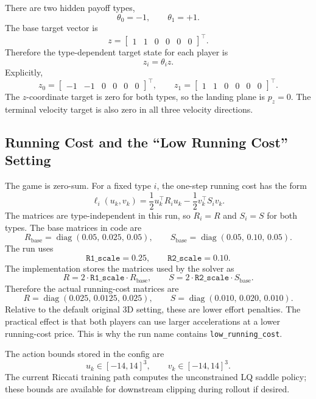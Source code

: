 \documentclass[11pt]{article}
\begin{document}
There are two hidden payoff types,
\[
    \theta_0=-1,\qquad \theta_1=+1.
\]
The base target vector is
\[
    z =
    \begin{bmatrix}
        1 & 1 & 0 & 0 & 0 & 0
    \end{bmatrix}^{\!\top}.
\]
Therefore the type-dependent target state for each player is
\[
    z_i = \theta_i z.
\]
Explicitly,
\[
    z_0 =
    \begin{bmatrix}
        -1 & -1 & 0 & 0 & 0 & 0
    \end{bmatrix}^{\!\top},
    \qquad
    z_1 =
    \begin{bmatrix}
        1 & 1 & 0 & 0 & 0 & 0
    \end{bmatrix}^{\!\top}.
\]
The $z$-coordinate target is zero for both types, so the landing plane is
$p_z=0$.  The terminal velocity target is also zero in all three velocity
directions.

\subsection{Running Cost and the ``Low Running Cost'' Setting}

The game is zero-sum.  For a fixed type $i$, the one-step running cost has the
form
\[
    \ell_i(u_k,v_k)
    =
    \frac{1}{2} u_k^\top R_i u_k
    -
    \frac{1}{2} v_k^\top S_i v_k.
\]
The matrices are type-independent in this run, so $R_i=R$ and $S_i=S$ for
both types.  The base matrices in code are
\[
    R_{\text{base}} =
    \operatorname{diag}(0.05,\,0.025,\,0.05),
    \qquad
    S_{\text{base}} =
    \operatorname{diag}(0.05,\,0.10,\,0.05).
\]
The run uses
\[
    \texttt{R1\_scale}=0.25,
    \qquad
    \texttt{R2\_scale}=0.10.
\]
The implementation stores the matrices used by the solver as
\[
    R = 2 \cdot \texttt{R1\_scale} \cdot R_{\text{base}},
    \qquad
    S = 2 \cdot \texttt{R2\_scale} \cdot S_{\text{base}}.
\]
Therefore the actual running-cost matrices are
\[
    R =
    \operatorname{diag}(0.025,\,0.0125,\,0.025),
    \qquad
    S =
    \operatorname{diag}(0.010,\,0.020,\,0.010).
\]
Relative to the default original 3D setting, these are lower effort penalties.
The practical effect is that both players can use larger accelerations at a
lower running-cost price.  This is why the run name contains
\texttt{low\_running\_cost}.

The action bounds stored in the config are
\[
    u_k \in [-14,14]^3,
    \qquad
    v_k \in [-14,14]^3.
\]
The current Riccati training path computes the unconstrained LQ saddle policy;
these bounds are available for downstream clipping during rollout if desired.
\end{document}
